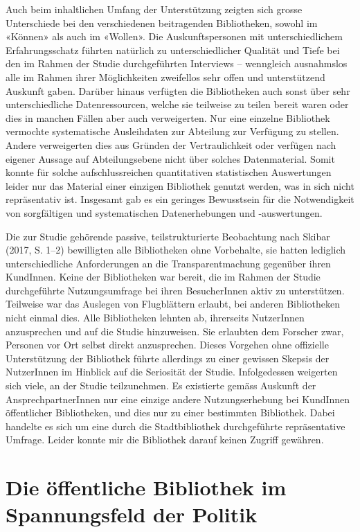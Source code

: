 \documentclass[a4paper,
fontsize=11pt,
oneside,
numbers=noperiodatend,
parskip=half-,
bibliography=totoc,
final
]{scrartcl}
\begin{document}
Auch beim inhaltlichen Umfang der Unterstützung zeigten sich grosse
Unterschiede bei den verschiedenen beitragenden Bibliotheken, sowohl im
«Können» als auch im «Wollen». Die Auskunftspersonen mit
unterschiedlichem Erfahrungsschatz führten natürlich zu
unterschiedlicher Qualität und Tiefe bei den im Rahmen der Studie
durchgeführten Interviews -- wenngleich ausnahmslos alle im Rahmen ihrer
Möglichkeiten zweifellos sehr offen und unterstützend Auskunft gaben.
Darüber hinaus verfügten die Bibliotheken auch sonst über sehr
unterschiedliche Datenressourcen, welche sie teilweise zu teilen bereit
waren oder dies in manchen Fällen aber auch verweigerten. Nur eine
einzelne Bibliothek vermochte systematische Ausleihdaten zur Abteilung
zur Verfügung zu stellen. Andere verweigerten dies aus Gründen der
Vertraulichkeit oder verfügen nach eigener Aussage auf Abteilungsebene
nicht über solches Datenmaterial. Somit konnte für solche
aufschlussreichen quantitativen statistischen Auswertungen leider nur
das Material einer einzigen Bibliothek genutzt werden, was in sich nicht
repräsentativ ist. Insgesamt gab es ein geringes Bewusstsein für die
Notwendigkeit von sorgfältigen und systematischen Datenerhebungen und
-auswertungen.

Die zur Studie gehörende passive, teilstrukturierte Beobachtung nach
Skibar (2017, S. 1--2) bewilligten alle Bibliotheken ohne Vorbehalte,
sie hatten lediglich unterschiedliche Anforderungen an die
Transparentmachung gegenüber ihren KundInnen. Keine der Bibliotheken war
bereit, die im Rahmen der Studie durchgeführte Nutzungsumfrage bei ihren
BesucherInnen aktiv zu unterstützen. Teilweise war das Auslegen von
Flugblättern erlaubt, bei anderen Bibliotheken nicht einmal dies. Alle
Bibliotheken lehnten ab, ihrerseits NutzerInnen anzusprechen und auf die
Studie hinzuweisen. Sie erlaubten dem Forscher zwar, Personen vor Ort
selbst direkt anzusprechen. Dieses Vorgehen ohne offizielle
Unterstützung der Bibliothek führte allerdings zu einer gewissen Skepsis
der NutzerInnen im Hinblick auf die Seriosität der Studie. Infolgedessen
weigerten sich viele, an der Studie teilzunehmen. Es existierte gemäss
Auskunft der AnsprechpartnerInnen nur eine einzige andere
Nutzungserhebung bei KundInnen öffentlicher Bibliotheken, und dies nur
zu einer bestimmten Bibliothek. Dabei handelte es sich um eine durch die
Stadtbibliothek durchgeführte repräsentative Umfrage. Leider konnte mir
die Bibliothek darauf keinen Zugriff gewähren.

\hypertarget{die-uxf6ffentliche-bibliothek-im-spannungsfeld-der-politik}{%
\section{Die öffentliche Bibliothek im Spannungsfeld der
Politik}\label{die-uxf6ffentliche-bibliothek-im-spannungsfeld-der-politik}}
\end{document}
